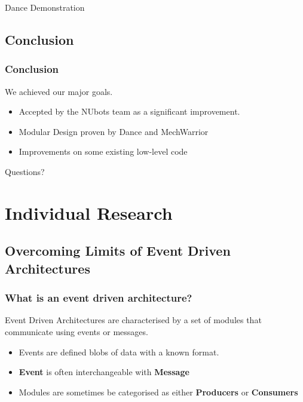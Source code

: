 \documentclass{beamer}
\begin{document}
	\begin{frame}
		\huge Dance Demonstration
	\end{frame}

	\subsection{Conclusion} %
	\begin{frame}
		\frametitle{Conclusion}
			We achieved our major goals.
			\begin{itemize}
				\item Accepted by the NUbots team as a significant improvement.
				\item Modular Design proven by Dance and MechWarrior
				\item Improvements on some existing low-level code
			\end{itemize}
	\end{frame}

	\begin{frame}
		\huge Questions?
	\end{frame}

\section{Individual Research}
\begin{frame}
	\sectionpage
\end{frame}

	\subsection{Overcoming Limits of Event Driven Architectures}
	\begin{frame}
		\subsectionpage
	\end{frame}

	\begin{frame}
		\frametitle{What is an event driven architecture?}

		Event Driven Architectures are characterised by a set of modules that communicate using events or messages.
		\begin{itemize}
			\item Events are defined blobs of data with a known format.
			\item \textbf{Event} is often interchangeable with \textbf{Message}
			\item Modules are sometimes be categorised as either \textbf{Producers} or \textbf{Consumers}
		\end{itemize}

	\end{frame}
\end{document}
